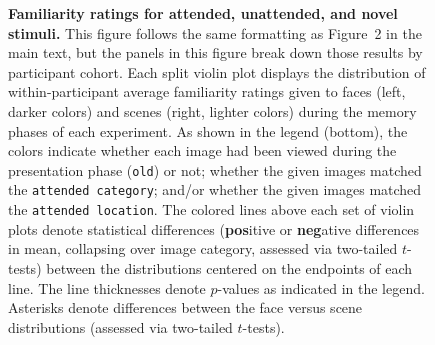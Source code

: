 \documentclass{article}
\begin{document}
\begin{figure}
\caption{\textbf{Familiarity ratings for attended, unattended, and
    novel stimuli.}  This figure follows the same formatting as
  Figure~2 in the main text, but the panels in this figure break down
  those results by participant cohort.  Each split violin plot displays the distribution of within-participant average familiarity ratings given to faces (left, darker colors) and scenes (right, lighter colors) during the memory phases of each experiment.  As shown in the legend (bottom), the colors indicate whether each image had been viewed during the presentation phase (\texttt{old}) or not; whether the given images matched the \texttt{attended category}; and/or whether the given images matched the \texttt{attended location}.  The colored lines above each set of violin plots denote statistical differences  (\textbf{pos}itive or \textbf{neg}ative differences in mean, collapsing over image category, assessed via two-tailed $t$-tests) between the distributions centered on the endpoints of each line.  The line thicknesses denote $p$-values as indicated in the legend.  Asterisks denote differences between the face versus scene distributions (assessed via two-tailed $t$-tests).}

\end{figure}





\end{document}
